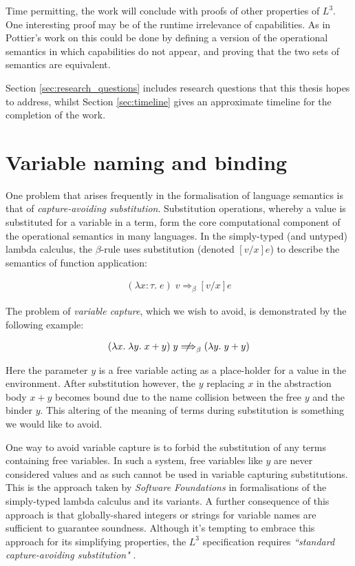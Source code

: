 \documentclass[]{unswthesis}
\newcommand{\SSPHS}{\text{SSPHS }}
\begin{document}
Time permitting, the work will conclude with proofs of other properties of $L^3$. One interesting proof may be of the runtime irrelevance of capabilities. As in Pottier's  work on \SSPHS \cite{pottier13} this could be done by defining a version of the operational semantics in which capabilities do not appear, and proving that the two sets of semantics are equivalent.

Section \ref{sec:research_questions} includes research questions that this thesis hopes to address, whilst Section \ref{sec:timeline} gives an approximate timeline for the completion of the work.

\section{Variable naming and binding}
\label{sec:var_naming}

One problem that arises frequently in the formalisation of language semantics is that of \textit{capture-avoiding substitution}. Substitution operations, whereby a value is substituted for a variable in a term, form the core computational component of the operational semantics in many languages. In the simply-typed (and untyped) lambda calculus, the $\beta$-rule uses substitution (denoted $[v/x]e$) to describe the semantics of function application:

\begin{eqnarray*}
(\lambda x : \tau. \; e) \; v \Longrightarrow_\beta [v/x]e
\end{eqnarray*}

The problem of \textit{variable capture}, which we wish to avoid, is demonstrated by the following example:

\begin{eqnarray*}
(\lambda x. \; \lambda y. \; x + y) \; y \; {\centernot\Longrightarrow}_\beta \; (\lambda y. \; y + y)
\end{eqnarray*}

Here the parameter $y$ is a free variable acting as a place-holder for a value in the environment. After substitution however, the $y$ replacing $x$ in the abstraction body $x + y$ becomes bound due to the name collision between the free $y$ and the binder $y$. This altering of the meaning of terms during substitution is something we would like to avoid.

One way to avoid variable capture is to forbid the substitution of any terms containing free variables. In such a system, free variables like $y$ are never considered values and as such cannot be used in variable capturing substitutions. This is the approach taken by \textit{Software Foundations} \cite{pierce15} in formalisations of the simply-typed lambda calculus and its variants. A further consequence of this approach is that globally-shared integers or strings for variable names are sufficient to guarantee soundness. Although it's tempting to embrace this approach for its simplifying properties, the $L^3$ specification requires \textit{``standard capture-avoiding substitution"} \cite{ahmed05}.
\end{document}
